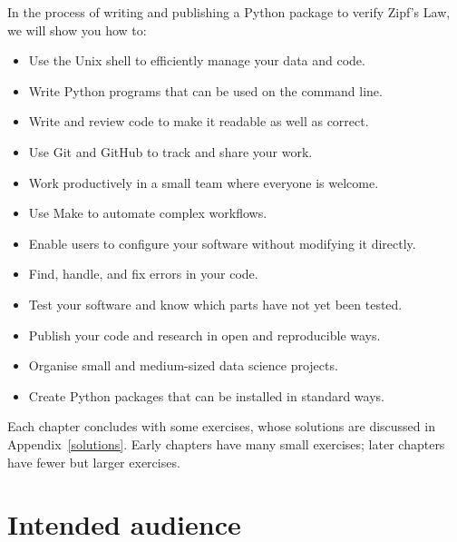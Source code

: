 \documentclass[
]{krantz}
\providecommand{\tightlist}{%
  \setlength{\itemsep}{0pt}\setlength{\parskip}{0pt}}
\begin{document}
In the process of writing and publishing a Python package to verify Zipf's Law,
we will show you how to:

\begin{itemize}
\tightlist
\item
  Use the Unix shell to efficiently manage your data and code.
\item
  Write Python programs that can be used on the command line.
\item
  Write and review code to make it readable as well as correct.
\item
  Use Git and GitHub to track and share your work.
\item
  Work productively in a small team where everyone is welcome.
\item
  Use Make to automate complex workflows.
\item
  Enable users to configure your software without modifying it directly.
\item
  Find, handle, and fix errors in your code.
\item
  Test your software and know which parts have not yet been tested.
\item
  Publish your code and research in open and reproducible ways.
\item
  Organise small and medium-sized data science projects.
\item
  Create Python packages that can be installed in standard ways.
\end{itemize}

Each chapter concludes with some exercises,
whose solutions are discussed in Appendix~\ref{solutions}.
Early chapters have many small exercises;
later chapters have fewer but larger exercises.

\hypertarget{intro-personas}{%
\section{Intended audience}\label{intro-personas}}
\end{document}
